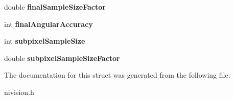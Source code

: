 \begin{DoxyCompactItemize}
\item 
\hypertarget{structLearnPatternAdvancedRotationOptions__struct_a6c00f323c465ca7808138eb02dd57147}{double {\bfseries final\-Sample\-Size\-Factor}}\label{structLearnPatternAdvancedRotationOptions__struct_a6c00f323c465ca7808138eb02dd57147}

\item 
\hypertarget{structLearnPatternAdvancedRotationOptions__struct_af43cac1c172e5ec6df93e0deb62a8413}{int {\bfseries final\-Angular\-Accuracy}}\label{structLearnPatternAdvancedRotationOptions__struct_af43cac1c172e5ec6df93e0deb62a8413}

\item 
\hypertarget{structLearnPatternAdvancedRotationOptions__struct_a79ee7067d09ba7aa36b8438dbb24971d}{int {\bfseries subpixel\-Sample\-Size}}\label{structLearnPatternAdvancedRotationOptions__struct_a79ee7067d09ba7aa36b8438dbb24971d}

\item 
\hypertarget{structLearnPatternAdvancedRotationOptions__struct_a7e2308c024331b076735ca9443d7dd00}{double {\bfseries subpixel\-Sample\-Size\-Factor}}\label{structLearnPatternAdvancedRotationOptions__struct_a7e2308c024331b076735ca9443d7dd00}

\end{DoxyCompactItemize}


\-The documentation for this struct was generated from the following file\-:\begin{DoxyCompactItemize}
\item 
nivision.\-h\end{DoxyCompactItemize}
